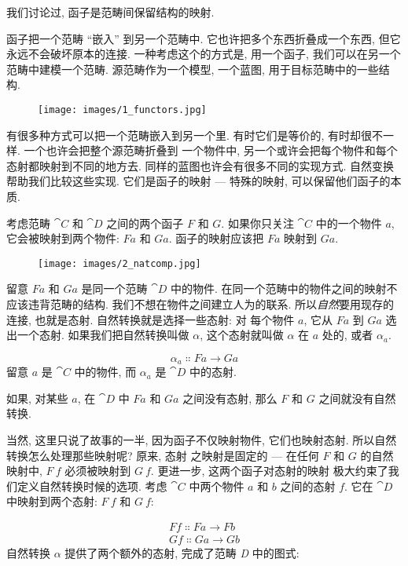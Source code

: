 
\lettrine[lhang=0.17]{我}{们讨论过,} 函子是范畴间保留结构的映射.

函子把一个范畴 ``嵌入'' 到另一个范畴中. 它也许把多个东西折叠成一个东西, 但它永远不会破坏原本的连接.
一种考虑这个的方式是, 用一个函子, 我们可以在另一个范畴中建模一个范畴. 源范畴作为一个模型, 一个蓝图, 用于目标范畴中的一些结构.

\begin{figure}[H]
  \centering\texttt{[image: images/1\_functors.jpg]}
\end{figure}

\noindent
有很多种方式可以把一个范畴嵌入到另一个里. 有时它们是等价的, 有时却很不一样. 一个也许会把整个源范畴折叠到
一个物件中, 另一个或许会把每个物件和每个态射都映射到不同的地方去. 同样的蓝图也许会有很多不同的实现方式.
自然变换帮助我们比较这些实现. 它们是函子的映射 --- 特殊的映射, 可以保留他们函子的本质.

考虑范畴 $\cat{C}$ 和 $\cat{D}$ 之间的两个函子 $F$ 和 $G$. 如果你只关注 $\cat{C}$ 中的一个物件 $a$,
它会被映射到两个物件: $F a$ 和 $G a$. 函子的映射应该把 $F a$ 映射到 $G a$.

\begin{figure}[H]
  \centering
  \texttt{[image: images/2\_natcomp.jpg]}
\end{figure}

\noindent
留意 $F a$ 和 $G a$ 是同一个范畴 $\cat{D}$ 中的物件. 在同一个范畴中的物件之间的映射不应该违背范畴的结构.
我们不想在物件之间建立人为的联系. 所以\emph{自然}要用现存的连接, 也就是态射. 自然转换就是选择一些态射: 对
每个物件 $a$, 它从 $F a$ 到 $G a$ 选出一个态射. 如果我们把自然转换叫做 $\alpha$, 这个态射就叫做 $\alpha$
在 $a$ 处的, 或者 $\alpha_a$.

\[\alpha_a \Colon F a \to G a\]
留意 $a$ 是 $\cat{C}$ 中的物件, 而 $\alpha_a$ 是 $\cat{D}$ 中的态射.

如果, 对某些 $a$, 在 $\cat{D}$ 中 $F a$ 和 $G a$ 之间没有态射, 那么 $F$ 和 $G$ 之间就没有自然转换.

当然, 这里只说了故事的一半, 因为函子不仅映射物件, 它们也映射态射. 所以自然转换怎么处理那些映射呢? 原来, 态射
之映射是固定的 --- 在任何 $F$ 和 $G$ 的自然映射中, $F\ f$ 必须被映射到 $G\ f$. 更进一步, 这两个函子对态射的映射
极大约束了我们定义自然转换时候的选项. 考虑 $\cat{C}$ 中两个物件 $a$ 和 $b$ 之间的态射 $f$. 它在 $\cat{D}$
中映射到两个态射: $F\ f$ 和 $G\ f$:

\begin{gather*}
  F f \Colon F a \to F b \\
  G f \Colon G a \to G b
\end{gather*}
自然转换 $\alpha$ 提供了两个额外的态射, 完成了范畴 \emph{D} 中的图式:

